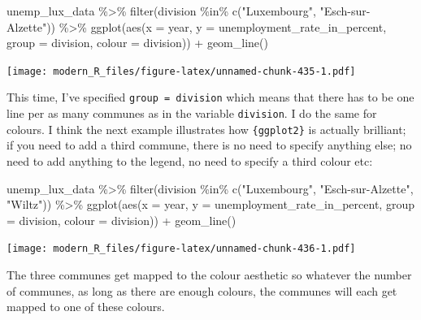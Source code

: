\documentclass[
]{article}
\newenvironment{Shaded}{\begin{snugshade}}{\end{snugshade}}
\newcommand{\AttributeTok}[1]{\textcolor[rgb]{0.77,0.63,0.00}{#1}}
\newcommand{\FunctionTok}[1]{\textcolor[rgb]{0.00,0.00,0.00}{#1}}
\newcommand{\NormalTok}[1]{#1}
\newcommand{\SpecialCharTok}[1]{\textcolor[rgb]{0.00,0.00,0.00}{#1}}
\newcommand{\StringTok}[1]{\textcolor[rgb]{0.31,0.60,0.02}{#1}}
\begin{document}
\begin{Shaded}
\begin{Highlighting}[]
\NormalTok{unemp\_lux\_data }\SpecialCharTok{\%\textgreater{}\%}
  \FunctionTok{filter}\NormalTok{(division }\SpecialCharTok{\%in\%} \FunctionTok{c}\NormalTok{(}\StringTok{"Luxembourg"}\NormalTok{, }\StringTok{"Esch{-}sur{-}Alzette"}\NormalTok{)) }\SpecialCharTok{\%\textgreater{}\%}
  \FunctionTok{ggplot}\NormalTok{(}\FunctionTok{aes}\NormalTok{(}\AttributeTok{x =}\NormalTok{ year, }\AttributeTok{y =}\NormalTok{ unemployment\_rate\_in\_percent, }\AttributeTok{group =}\NormalTok{ division, }\AttributeTok{colour =}\NormalTok{ division)) }\SpecialCharTok{+}
  \FunctionTok{geom\_line}\NormalTok{()}
\end{Highlighting}
\end{Shaded}

\texttt{[image: modern\_R\_files/figure-latex/unnamed-chunk-435-1.pdf]}

This time, I've specified \texttt{group\ =\ division} which means that there has to be one line per as many
communes as in the variable \texttt{division}. I do the same for colours. I think the next example
illustrates how \texttt{\{ggplot2\}} is actually brilliant; if you need to add a third commune, there is no
need to specify anything else; no need to add anything to the legend, no need to specify a third
colour etc:

\begin{Shaded}
\begin{Highlighting}[]
\NormalTok{unemp\_lux\_data }\SpecialCharTok{\%\textgreater{}\%}
  \FunctionTok{filter}\NormalTok{(division }\SpecialCharTok{\%in\%} \FunctionTok{c}\NormalTok{(}\StringTok{"Luxembourg"}\NormalTok{, }\StringTok{"Esch{-}sur{-}Alzette"}\NormalTok{, }\StringTok{"Wiltz"}\NormalTok{)) }\SpecialCharTok{\%\textgreater{}\%}
  \FunctionTok{ggplot}\NormalTok{(}\FunctionTok{aes}\NormalTok{(}\AttributeTok{x =}\NormalTok{ year, }\AttributeTok{y =}\NormalTok{ unemployment\_rate\_in\_percent, }\AttributeTok{group =}\NormalTok{ division, }\AttributeTok{colour =}\NormalTok{ division)) }\SpecialCharTok{+}
  \FunctionTok{geom\_line}\NormalTok{()}
\end{Highlighting}
\end{Shaded}

\texttt{[image: modern\_R\_files/figure-latex/unnamed-chunk-436-1.pdf]}

The three communes get mapped to the colour aesthetic so whatever the number of communes, as long
as there are enough colours, the communes will each get mapped to one of these colours.
\end{document}
